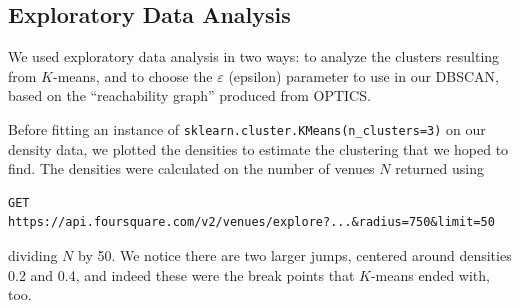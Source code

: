 \documentclass{article}
\begin{document}
\begin{itemize}
%
\end{itemize}

\subsection{Exploratory Data Analysis}

We used exploratory data analysis in two ways: to analyze the clusters resulting from $K$-means, and to choose the $\varepsilon$ (epsilon) parameter to use in our DBSCAN, based on the ``reachability graph'' produced from OPTICS. 
\vspace{1cm}

 Before fitting an instance of {\tt sklearn.cluster.KMeans(n\_clusters=3)} on our density data, we plotted the densities to estimate the clustering that we hoped to find. The densities were calculated on the number of venues $N$ returned using 
\begin{verbatim}GET https://api.foursquare.com/v2/venues/explore?...&radius=750&limit=50\end{verbatim}
dividing $N$ by 50. We notice there are two larger jumps, centered around densities 0.2 and 0.4, and indeed these were the break points that $K$-means ended with, too. 
\end{document}
